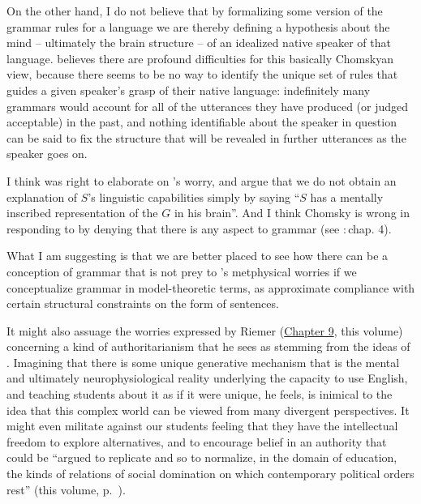 \documentclass[output=paper]{langscibook}
\begin{document}
On the other hand, I do not believe that by formalizing some version of the grammar rules for a language we are thereby defining a hypothesis about the mind -- ultimately the brain structure -- of an idealized native speaker of that language. \citet{Kripke82} believes there are profound difficulties for this basically Chomskyan view, because there seems to be no way to identify the unique set of rules that guides a given speaker's grasp of their native language: indefinitely many grammars would account for all of the utterances they have produced (or judged acceptable) in the past, and nothing identifiable about the speaker in question can be said to fix the structure that will be revealed in further utterances as the speaker goes on.

I think \citet{Scholz90} was right to elaborate on {\Kripke}'s worry, and argue that we do not obtain an explanation of $S$'s linguistic capabilities simply by saying ``$S$ has a mentally inscribed representation of the  $G$ in his brain''. And I think Chomsky is wrong in responding to {\Kripke} by denying that there is any  aspect to grammar (see \citealt{Chomsky86KL}:\,chap. 4).

What I am suggesting is that we are better placed to see how there can be a  conception of grammar that is not prey to {\Kripke}'s metphysical worries if we conceptualize grammar in model-theoretic terms, as approximate compliance with certain structural constraints on the form of sentences.

It might also assuage the worries expressed by Riemer (\hyperref[chap:riemer]{Chapter 9}, this volume) concerning a kind of authoritarianism that he sees as stemming from the ideas of . Imagining that there is some unique generative mechanism that is the mental and ultimately neurophysiological reality underlying the capacity to use English, and teaching students about it as if it were unique, he feels, is inimical to the idea that this complex world can be viewed from many divergent perspectives. It might even militate against our students feeling that they have the intellectual freedom to explore alternatives, and to encourage belief in an authority that could be ``argued to replicate and so to normalize, in the domain of education, the kinds of relations of social domination on which contemporary political orders rest'' (this volume, p.~\pageref{q:riemer:domination}).
\end{document}
